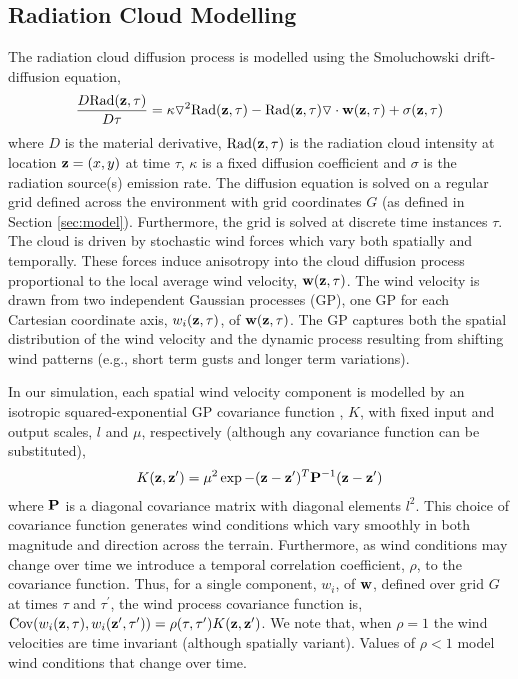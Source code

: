 \subsection{Radiation Cloud Modelling}\label{sec:radiation}
\noindent The radiation cloud diffusion process is modelled using the Smoluchowski drift-diffusion equation, 
\begin{eqnarray}
\frac{D \text{Rad}({\bf z}, \tau)}{D \tau}=\kappa \triangledown^2 \text{Rad}({\bf z},\tau)-\text{Rad}({\bf z},\tau)\triangledown \cdot {\bf w}({\bf z},\tau)+\sigma({\bf z},\tau)
\label{clouddyns}
\end{eqnarray}
where $D$ is the material derivative, $\text{Rad}({\bf z},\tau)$ is the radiation cloud intensity at location ${\bf z}=(x,y)$ at time $\tau$, $\kappa$ is a fixed diffusion coefficient and $\sigma$ is the radiation source(s) emission rate. The diffusion equation is solved on a regular grid defined across the environment with grid coordinates $G$ (as defined in Section \ref{sec:model}).  Furthermore, the grid is solved at discrete time instances $\tau$.  The cloud is driven by stochastic wind forces which vary both spatially and temporally.  These forces induce anisotropy into the cloud diffusion process  proportional to the local average wind velocity, ${\bf w}({\bf z},\tau)$.  The wind velocity is drawn from two independent Gaussian processes (GP), one GP for each Cartesian coordinate axis, $w_i({\bf z},\tau)$, of ${\bf w}({\bf z},\tau)$.  The GP captures both the spatial distribution of the wind velocity and the dynamic process resulting from shifting wind patterns (e.g., short term gusts and longer term variations). 

In our simulation, each spatial wind velocity component is modelled by an isotropic squared-exponential GP covariance function \cite{rasmussen06}, $K$, with fixed input and output scales, $l$ and $\mu$, respectively (although any covariance function can be substituted),
\begin{eqnarray*}
K({\bf z},{\bf z}^\prime)=\mu^2\exp -({\bf z}-{\bf z}^\prime)^T {\bf P}^{-1}({\bf z}-{\bf z}^\prime)
\end{eqnarray*}
where ${\bf P}$ is a diagonal covariance matrix with diagonal elements $l^2$.  This choice of covariance function generates wind conditions which vary smoothly in both magnitude and direction across the terrain.  Furthermore, as wind conditions may change over time we introduce a temporal correlation coefficient, $\rho$, to the covariance function.  Thus, for a single component, $w_i$, of ${\bf w}$, defined over grid $G$ at times $\tau$ and $\tau^\prime$, the wind process covariance function is, $\text{Cov}(w_i({\bf z},\tau),w_i({\bf z^\prime},\tau^\prime))=\rho(\tau,\tau^\prime) K({\bf z},{\bf z}^\prime)$.  We note that, when $\rho=1$ the wind velocities are time invariant (although spatially variant).  Values of $\rho<1$ model wind conditions that change over time.

